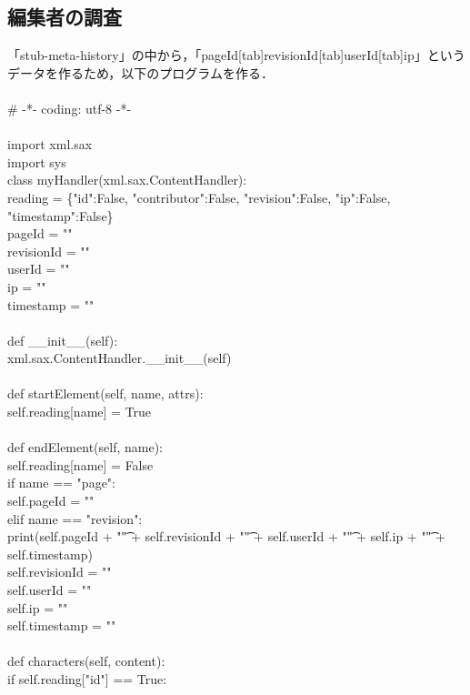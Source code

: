 \subsection{編集者の調査}


「stub-meta-history」の中から，「pageId[tab]revisionId[tab]userId[tab]ip」というデータを作るため，以下のプログラムを作る．\\
\\
\# -*- coding: utf-8 -*- \\
\\
import xml.sax \\
import sys \\

class myHandler(xml.sax.ContentHandler): \\
  reading = \{"id":False, "contributor":False, "revision":False, "ip":False, "timestamp":False\} \\
  pageId = "" \\
  revisionId = "" \\
  userId = "" \\
  ip = "" \\
  timestamp = "" \\
\\
  def \_\_init\_\_(self): \\
    xml.sax.ContentHandler.\_\_init\_\_(self) \\
\\ 
  def startElement(self, name, attrs): \\
    self.reading[name] = True \\
\\ 
  def endElement(self, name): \\
    self.reading[name] = False \\
    if name == "page": \\
      self.pageId = "" \\
    elif name == "revision": \\
      print(self.pageId + "\t" + self.revisionId + "\t" + self.userId + "\t" + self.ip + "\t" + \\
      self.timestamp) \\
      self.revisionId = "" \\
      self.userId = "" \\
      self.ip = "" \\
      self.timestamp = "" \\
\\ 
  def characters(self, content): \\
    if self.reading["id"] == True: \\
